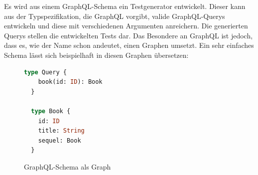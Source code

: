 Es wird aus einem GraphQL-Schema ein Testgenerator entwickelt.
Dieser kann aus der Typspezifikation, die GraphQL vorgibt, valide GraphQL-Querys entwickeln und diese mit verschiedenen Argumenten anreichern.
Die generierten Querys stellen die entwickelten Tests dar.
Das Besondere an GraphQL ist jedoch, dass es, wie der Name schon andeutet, einen Graphen umsetzt.
Ein sehr einfaches Schema lässt sich beispielhaft in diesen Graphen übersetzen:

\begin{figure}[h!]
    \centering
    \begin{minipage}{0.45\textwidth}
        \begin{lstlisting}[language=GraphQL]
  type Query {
    book(id: ID): Book
  }

  type Book {
    id: ID
    title: String
    sequel: Book
  }
        \end{lstlisting}
    \end{minipage}
    \hfill %
    \begin{minipage}{0.45\textwidth}
    \end{minipage}
    \caption{GraphQL-Schema als Graph}
\end{figure}

